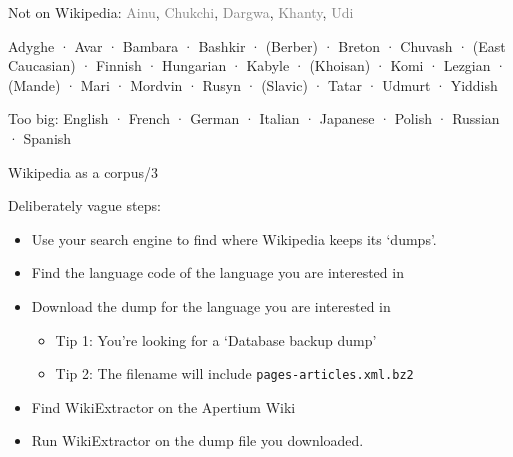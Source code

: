 \documentclass[10pt, compress]{beamer}
\begin{document}
\begin{frame}[standout]


{\small
Not on Wikipedia:  \textcolor{gray}{Ainu}, \textcolor{gray}{Chukchi}, \textcolor{gray}{Dargwa}, \textcolor{gray}{Khanty}, \textcolor{gray}{Udi}
}

Adyghe ·  Avar · Bambara · Bashkir · (Berber) · Breton · Chuvash · (East Caucasian) · Finnish · Hungarian · Kabyle · (Khoisan) · Komi · Lezgian · (Mande) · Mari · Mordvin · Rusyn · (Slavic) · Tatar · Udmurt · Yiddish

{\small 
Too big: English ·  French ·
German · Italian · Japanese · Polish · Russian · Spanish
}

\end{frame}

\begin{frame}{Wikipedia as a corpus/3}

Deliberately vague steps:

\begin{itemize}
  \item Use your search engine to find where Wikipedia keeps its `dumps'.
  \item Find the language code of the language you are interested in
  \item Download the dump for the language you are interested in
  \begin{itemize}
    \item Tip 1: You're looking for a `Database backup dump'
    \item Tip 2: The filename will include {\tt pages-articles.xml.bz2}
  \end{itemize}
  \item Find WikiExtractor on the Apertium Wiki
  \item Run WikiExtractor on the dump file you downloaded. 
\end{itemize}

\end{frame}
\end{document}
